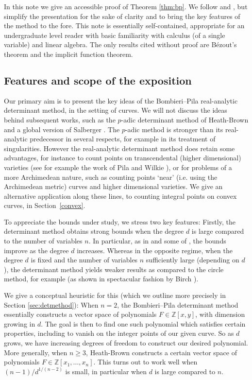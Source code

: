 \documentclass[12pt]{amsart}
\newcommand{\Z}{{\mathbb Z}}
\newcommand{\1}{{\mathbf 1}}
\theoremstyle{remark}
\theoremstyle{definition}
\begin{document}
In this note we give an accessible proof of Theorem \ref{thm:bp}. We follow \cite{BP89} and \cite{Pi96}, but simplify the presentation for the sake of clarity and to bring the key features of the method to the fore. This note is essentially self-contained, appropriate for an undergraduate level reader with basic familiarity with calculus (of a single variable) and linear algebra. The only results cited without proof are B\'ezout's theorem and the implicit function theorem.

\subsection{Features and scope of the exposition}\label{subsec:scope}
Our primary aim is to present the key ideas of the Bombieri--Pila real-analytic determinant method, in the setting of curves. We will not discuss the ideas behind subsequent works, such as the $p$-adic determinant method of Heath-Brown \cite{HB02} and a global version of Salberger \cite{Sa23}. The $p$-adic method is stronger than its real-analytic predecessor in several respects, for example in its treatment of singularities. However the real-analytic determinant method does retain some advantages, for instance to count points on transcendental (higher dimensional) varieties (see for example the work of Pila and Wilkie \cite{PW06}), or for problems of a more Archimedean nature, such as counting points `near' (i.e. using the Archimedean metric) curves and higher dimensional varieties. We give an alternative application along these lines, to counting integral points on convex curves, in Section~\ref{convex}.

To appreciate the bounds under study, we stress two key features: Firstly, the determinant method obtains strong bounds when the degree $d$ is large compared to the number of variables $n$. In particular, as in \cite{BP89} and some of \cite{HB02}, the bounds improve as the degree $d$ increases. Whereas in the opposite regime, when the degree $d$ is fixed and the number of variables $n$ sufficiently large (depending on $d$), the determinant method yields weaker results as compared to the circle method, for example (as shown in spectacular fashion by Birch \cite{Bir57}). 

We give a conceptual heuristic for this (which we outline more precisely in Section \ref{sec:detmethod}): When $n=2$, the Bombieri--Pila determinant method essentially constructs a vector space of polynomials $F\in\Z[x,y]$, with dimension growing in $d$. The goal is then to find one such polynomial which satisfies certain properties, including to vanish on the integer points of our given curve. So as $d$ grows, we have increasing degrees of freedom to construct our desired polynomial. More generally, when $n\ge3$, Heath-Brown constructs a certain vector space of polynomials $F\in\Z[x_1,\ldots,x_n]$. This turns out to work well when $(n-1)/d^{1/(n-2)}$ is small, in particular when $d$ is large compared to $n$.
\end{document}

